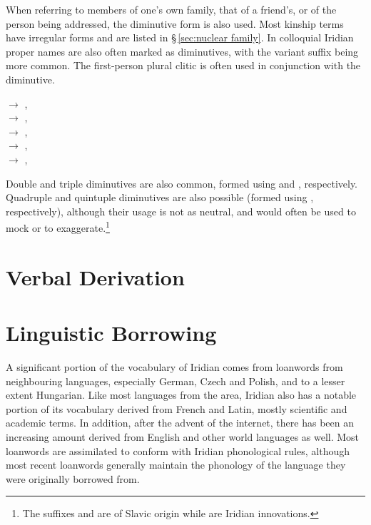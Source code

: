 When referring to members of one's own family, that of a friend's, or of the person being addressed, the diminutive form is also used. Most kinship terms have irregular forms and are listed in \S\,\ref{sec:nuclear family}. In colloquial Iridian proper names are also often marked as diminutives, with the variant suffix  being more common. The first-person plural clitic  is often used in conjunction with the diminutive.

\ex
{} $\rightarrow$ , \\
 $\rightarrow$ , \\
 $\rightarrow$ , \\
 $\rightarrow$ , \\
 $\rightarrow$ , \\
\xe

Double and triple diminutives are also common, formed using  and , respectively. Quadruple and quintuple diminutives are also possible (formed using  , respectively), although their usage is not as neutral, and would often be used to mock or to exaggerate.\footnote{The suffixes  and  are of Slavic origin while   are Iridian innovations.}

\section{Verbal Derivation}
\section{Linguistic Borrowing}
A significant portion of the vocabulary of Iridian comes from loanwords from neighbouring languages, especially German, Czech and Polish, and to a lesser extent Hungarian. Like most languages from the area, Iridian also has a notable portion of its vocabulary derived from French and Latin, mostly scientific and academic terms. In addition, after the advent of the internet, there has been an increasing amount derived from English and other world languages as well. Most loanwords are assimilated to conform with Iridian phonological rules, although most recent loanwords generally maintain the phonology of the language they were originally borrowed from.

